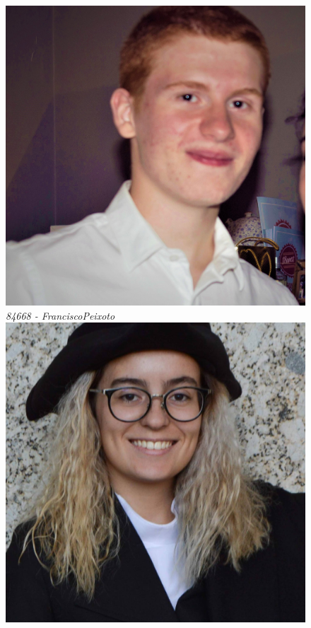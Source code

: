 \documentclass[a4paper]{report} %
\begin{document}
\begin{titlepage}
\begin{center}
\begin{figure}[!htb]
  \includegraphics[width=\linewidth]{Pics/84668.jpg}
  \textit{84668 - FranciscoPeixoto}
\endminipage\hfill
{}
  \includegraphics[width=\linewidth]{Pics/86268.jpg}

\end{figure}
\end{center}
\end{titlepage}
\end{document}

